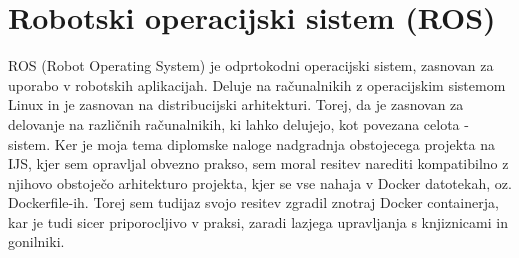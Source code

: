 \documentclass[a4paper,twoside,openright,12pt,slovene]{book}
\begin{document}
\section{Robotski operacijski sistem (ROS)} \label{ROS}
ROS (Robot Operating System) je odprtokodni operacijski sistem, zasnovan za uporabo v robotskih aplikacijah. Deluje na računalnikih z operacijskim sistemom Linux in je zasnovan na distribucijski arhitekturi. Torej, da je zasnovan za delovanje na različnih računalnikih, ki lahko delujejo, kot povezana celota - sistem. Ker je moja tema diplomske naloge nadgradnja obstojecega projekta na IJS, kjer sem opravljal obvezno prakso, sem moral resitev narediti kompatibilno z njihovo obstoječo arhitekturo projekta, kjer se vse nahaja v Docker datotekah, oz. Dockerfile-ih. Torej sem tudijaz svojo resitev zgradil znotraj Docker containerja, kar je tudi sicer priporocljivo v praksi, zaradi lazjega upravljanja s knjiznicami in gonilniki. 
\end{document}
